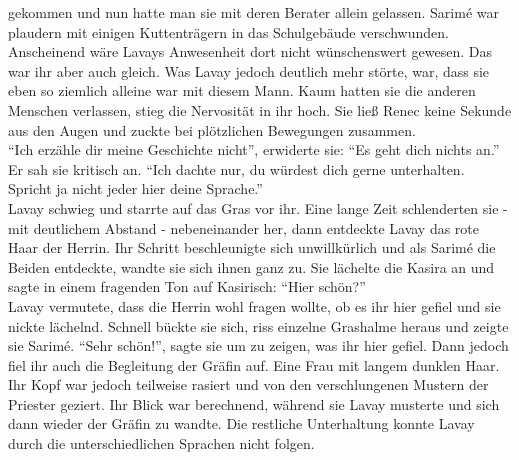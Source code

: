 gekommen und nun hatte man sie mit deren Berater allein gelassen. Sarimé war plaudern mit einigen 
Kuttenträgern in das Schulgebäude verschwunden. Anscheinend wäre Lavays Anwesenheit dort nicht 
wünschenswert gewesen. Das war ihr aber auch gleich. Was Lavay jedoch deutlich mehr störte, war, 
dass sie eben so ziemlich alleine war mit diesem Mann. Kaum hatten sie die anderen Menschen 
verlassen, stieg die Nervosität in ihr hoch. Sie ließ Renec keine Sekunde aus den Augen und zuckte 
bei plötzlichen Bewegungen zusammen.\\
``Ich erzähle dir meine Geschichte nicht'', erwiderte sie: ``Es geht dich nichts an.''\\
Er sah sie kritisch an. ``Ich dachte nur, du würdest dich gerne unterhalten. Spricht ja nicht jeder 
hier deine Sprache.''\\
Lavay schwieg und starrte auf das Gras vor ihr. Eine lange Zeit schlenderten sie - mit deutlichem 
Abstand - nebeneinander her, dann entdeckte Lavay das rote Haar der Herrin. Ihr Schritt 
beschleunigte sich unwillkürlich und als Sarimé die Beiden entdeckte, wandte sie sich ihnen ganz 
zu. Sie lächelte die Kasira an und sagte in einem fragenden Ton auf Kasirisch: ``Hier schön?''\\
Lavay vermutete, dass die Herrin wohl fragen wollte, ob es ihr hier gefiel und sie nickte lächelnd. 
Schnell bückte sie sich, riss einzelne Grashalme heraus und zeigte sie Sarimé. ``Sehr schön!'', 
sagte sie um zu zeigen, was ihr hier gefiel. Dann jedoch fiel ihr auch die Begleitung der Gräfin 
auf. Eine Frau mit langem dunklen Haar. Ihr Kopf war jedoch teilweise rasiert und von den 
verschlungenen Mustern der Priester geziert. Ihr Blick war berechnend, während sie Lavay musterte 
und sich dann wieder der Gräfin zu wandte. Die restliche Unterhaltung konnte Lavay durch die 
unterschiedlichen Sprachen nicht folgen.\\


